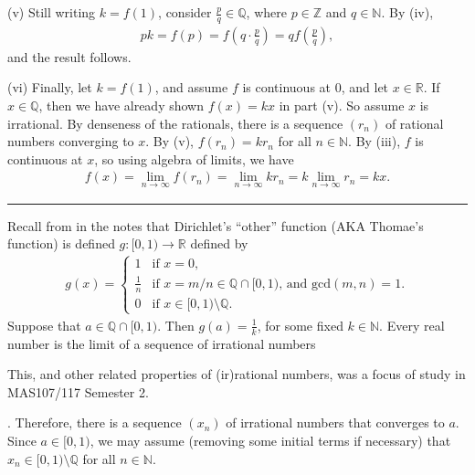 \documentclass[letterpaper,10pt,english]{jupyterBook}
\begin{document}
\sphinxAtStartPar
(v) Still writing \(k=f(1)\), consider \(\frac{p}{q}\in\mathbb{Q}\), where \(p\in \mathbb{Z}\) and \(q\in \mathbb{N}\). By (iv),
\begin{equation*}
\begin{split}
pk = f(p) = f\left(q\cdot \frac{p}{q}\right) = qf\left(\frac{p}{q}\right),
\end{split}
\end{equation*}
\sphinxAtStartPar
and the result follows.

\sphinxAtStartPar
(vi) Finally, let \(k=f(1)\), and assume \(f\) is continuous at \(0\), and let \(x\in\mathbb{R}\). If \(x\in\mathbb{Q}\), then we have already shown \(f(x)=kx\) in part (v). So assume \(x\) is irrational. By denseness of the rationals, there is a sequence \((r_n)\) of rational numbers converging to \(x\). By (v), \(f(r_n)=kr_n\) for all \(n\in\mathbb{N}\). By (iii), \(f\) is continuous at \(x\), so using algebra of limits, we have
\begin{equation*}
\begin{split}
f(x) = \lim_{n\rightarrow\infty} f(r_n) =   \lim_{n\rightarrow\infty} kr_n=k \lim_{n\rightarrow\infty} r_n = kx.
\end{split}
\end{equation*}

\bigskip\hrule\bigskip

\label{\detokenize{Solutions-upto46:id8}}
\sphinxAtStartPar
{\hyperref[\detokenize{Problems:id22}]{}} 
Recall from  in the notes that Dirichlet’s “other” function (AKA Thomae’s function) is defined  \(g:[0, 1)\rightarrow \mathbb{R}\) defined by
\begin{equation*}
\begin{split}
g(x) =\begin{cases}
	1 &\text{if $x = 0$},\\
	\displaystyle\frac{1}{n}& \text{if $x = m/n \in \mathbb{Q}\cap[0,1)$, and $\text{gcd}(m,n)=1$.}\\
	0&\text{if $x \in [0,1)\setminus \mathbb{Q}$}.
\end{cases}
\end{split}
\end{equation*}
\sphinxAtStartPar
Suppose that \(a \in \mathbb{Q}\cap[0,1)\). Then \(g(a)=\frac{1}{k}\), for some fixed \(k\in\mathbb{N}\). Every real number is the limit of a sequence of irrational numbers%
\begin{footnote}[1]\sphinxAtStartFootnote
This, and other related properties of (ir)rational numbers, was a focus of study in MAS107/117 Semester 2.
%
\end{footnote}. Therefore, there is a sequence \((x_{n})\) of irrational numbers that converges to \(a\). Since \(a\in[0,1)\), we may assume (removing some initial terms if necessary) that \(x_n\in[0,1)\setminus\mathbb{Q}\) for all \(n\in\mathbb{N}\).
\end{document}
